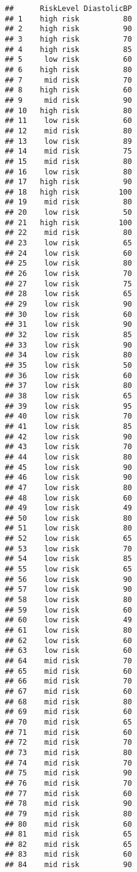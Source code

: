 \documentclass[
  ignorenonframetext,
]{beamer}
\begin{document}
\begin{frame}[fragile]
\begin{verbatim}
##      RiskLevel DiastolicBP
## 1    high risk          80
## 2    high risk          90
## 3    high risk          70
## 4    high risk          85
## 5     low risk          60
## 6    high risk          80
## 7     mid risk          70
## 8    high risk          60
## 9     mid risk          90
## 10   high risk          80
## 11    low risk          60
## 12    mid risk          80
## 13    low risk          89
## 14    mid risk          75
## 15    mid risk          80
## 16    low risk          80
## 17   high risk          90
## 18   high risk         100
## 19    mid risk          80
## 20    low risk          50
## 21   high risk         100
## 22    mid risk          80
## 23    low risk          65
## 24    low risk          60
## 25    low risk          80
## 26    low risk          70
## 27    low risk          75
## 28    low risk          65
## 29    low risk          90
## 30    low risk          60
## 31    low risk          90
## 32    low risk          85
## 33    low risk          90
## 34    low risk          80
## 35    low risk          50
## 36    low risk          60
## 37    low risk          80
## 38    low risk          65
## 39    low risk          95
## 40    low risk          70
## 41    low risk          85
## 42    low risk          90
## 43    low risk          70
## 44    low risk          80
## 45    low risk          90
## 46    low risk          90
## 47    low risk          80
## 48    low risk          60
## 49    low risk          49
## 50    low risk          80
## 51    low risk          80
## 52    low risk          65
## 53    low risk          70
## 54    low risk          85
## 55    low risk          65
## 56    low risk          90
## 57    low risk          90
## 58    low risk          80
## 59    low risk          60
## 60    low risk          49
## 61    low risk          80
## 62    low risk          60
## 63    low risk          60
## 64    mid risk          70
## 65    mid risk          60
## 66    mid risk          70
## 67    mid risk          60
## 68    mid risk          80
## 69    mid risk          60
## 70    mid risk          65
## 71    mid risk          60
## 72    mid risk          70
## 73    mid risk          80
## 74    mid risk          70
## 75    mid risk          90
## 76    mid risk          70
## 77    mid risk          60
## 78    mid risk          90
## 79    mid risk          80
## 80    mid risk          60
## 81    mid risk          65
## 82    mid risk          65
## 83    mid risk          60
## 84    mid risk          90

\end{verbatim}
\end{frame}
\end{document}
